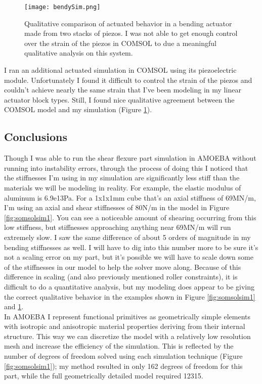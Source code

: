 {\begin{figure}
  \texttt{[image: bendySim.png]}
  \caption{Qualitative comparison of actuated behavior in a bending actuator made from two stacks of piezos.  I was not able to get enough control over the strain of the piezos in COMSOL to due a meaningful qualitative analysis on this system.}
  \label{fig:bendSim}
\end{figure}

I ran an additional actuated simulation in COMSOL using its piezoelectric module.  Unfortunately I found it difficult to control the strain of the piezos and couldn't achieve nearly the same strain that I've been modeling in my linear actuator block types.  Still, I found nice qualitative agreement between the COMSOL model and my simulation (Figure \ref{fig:bendSim}). 

\subsection{Conclusions}

Though I was able to run the shear flexure part simulation in AMOEBA without running into instability errors, through the process of doing this I noticed that the stiffnesses I'm using in my simulation are significantly less stiff than the materials we will be modeling in reality.  For example, the elastic modulus of aluminum is 6.9e13Pa.  For a 1x1x1mm cube that's an axial stiffness of 69MN/m, I'm using an axial and shear stiffnesses of 80N/m in the model in Figure \ref{fig:somsolsim1}.  You can see a noticeable amount of shearing occurring from this low stiffness, but stiffnesses approaching anything near 69MN/m will run extremely slow.  I saw the same difference of about 5 orders of magnitude in my bending stiffnesses as well.  I will have to dig into this number more to be sure it's not a scaling error on my part, but it's possible we will have to scale down some of the stiffnesses in our model to help the solver move along.  Because of this difference in scaling (and also previously mentioned roller constraints), it is difficult to do a quantitative analysis, but my modeling does appear to be giving the correct qualitative behavior in the examples shown in Figure \ref{fig:somsolsim1} and \ref{fig:bendSim}.\\

In AMOEBA I represent functional primitives as geometrically simple elements with isotropic and anisotropic material properties deriving from their internal structure.  This way we can discretize the model with a relatively low resolution mesh and increase the efficiency of the simulation.  This is reflected by the number of degrees of freedom solved using each simulation technique (Figure \ref{fig:somsolsim1}); my method resulted in only 162 degrees of freedom for this part, while the full geometrically detailed model required 12315.\\

}
